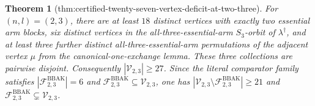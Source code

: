 \documentclass{article}
\newtheorem{theorem}{Theorem}
\begin{document}
\begin{theorem}[thm:certified-twenty-seven-vertex-deficit-at-two-three]\label{thm:certified-twenty-seven-vertex-deficit-at-two-three}
For \((n,l)=(2,3)\), there are at least \(18\) distinct vertices with exactly two essential arm blocks, six distinct vertices in the all-three-essential-arm \(S_3\)-orbit of \(\lambda^\dagger\), and at least three further distinct all-three-essential-arm permutations of the adjacent vertex \(\mu\) from the canonical-one-exchange lemma. These three collections are pairwise disjoint. Consequently \(|\mathcal V_{2,3}|\ge27\). Since the literal comparator family satisfies \(|\mathcal F^{\mathrm{BBAK}}_{2,3}|=6\) and \(\mathcal F^{\mathrm{BBAK}}_{2,3}\subseteq\mathcal V_{2,3}\), one has \(|\mathcal V_{2,3}\setminus\mathcal F^{\mathrm{BBAK}}_{2,3}|\ge21\) and \(\mathcal F^{\mathrm{BBAK}}_{2,3}\subsetneq\mathcal V_{2,3}\).
\end{theorem}
\end{document}
